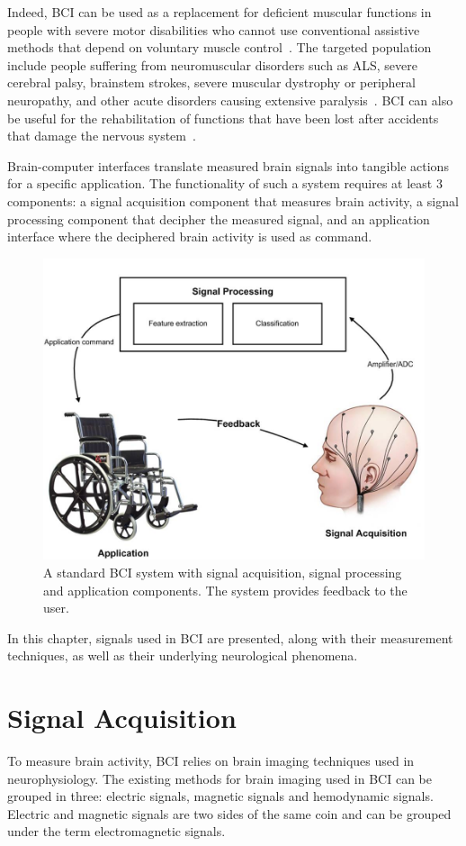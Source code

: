 Indeed, BCI can be used as a replacement for deficient muscular functions in people with severe motor disabilities who cannot use conventional assistive methods that depend on voluntary muscle control~\citep{wolpaw_brain-computer_2002}. 
The targeted population include people suffering from neuromuscular disorders such as ALS, severe cerebral palsy, brainstem strokes, severe muscular dystrophy or peripheral neuropathy, and other acute disorders causing extensive paralysis~\citep{daly_brain-computer_2008}.  
BCI can also be useful for the rehabilitation of functions that have been lost after accidents that damage the nervous system~\citep{silvoni_brain-computer_2011}.  
 
Brain-computer interfaces translate measured brain signals into tangible actions for a specific application. The functionality of such a system requires at least 3 components: a signal acquisition component that measures brain activity, a signal processing component that decipher the measured signal, and an application interface where the deciphered brain activity is used as command.
\begin{figure}[!h]
\centering
\includegraphics[width=0.5\columnwidth]{Figures/BCI-system}
\caption{A standard BCI system with signal acquisition, signal processing and application components. The system provides feedback to the user.}
\end{figure}

In this chapter, signals used in BCI are presented, along with their measurement techniques, as well as their underlying neurological phenomena.  
\section{Signal Acquisition}
\label{sec:signal_aquisition}
To measure brain activity, BCI relies on brain imaging techniques used in neurophysiology. 
The existing methods for brain imaging used in BCI can be grouped in three: electric signals, magnetic signals and hemodynamic signals.
Electric and magnetic signals are two sides of the same coin and can be grouped under the term electromagnetic signals.
